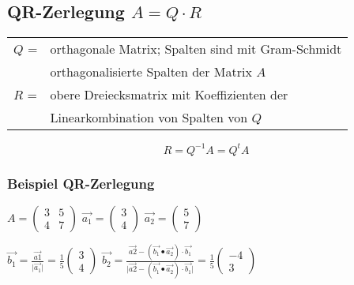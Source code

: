 				
				
				
				
		    \subsection{QR-Zerlegung $A = Q \cdot R$}
		    \begin{tabular}{ll}
		    $Q$ = & orthagonale Matrix; Spalten sind mit Gram-Schmidt\\
		          & orthagonalisierte Spalten der Matrix $A$ \\
		    $R$ = & obere Dreiecksmatrix mit Koeffizienten der  \\
		    		  & Linearkombination von Spalten von $Q$ \\   
		    \end{tabular}
		    
			$$R = Q^{-1} A = Q^t A$$    
			
			
			\subsubsection{Beispiel QR-Zerlegung}
		  	$A = \begin{pmatrix} 3 & 5 \\ 4 & 7 \end{pmatrix}$ \quad $\vec{a_1} = \begin{pmatrix}
		  	3 \\ 4 \end{pmatrix}$ \quad $\vec{a_2} = \begin{pmatrix} 5 \\ 7 \end{pmatrix}$ \\
		  	
		  	\vspace{0.2cm}
		  	
		  	
		  	$\vec{b_1} = \frac{\vec{a1}}{\vert \vec{a_1} \vert} = \frac{1}{5} \begin{pmatrix} 3 \\ 4 \end{pmatrix} $ \quad $\vec{b_2} = \frac{\vec{a2} - (\vec{b_1} \bullet \vec{a_2}) \cdot \vec{b_1}}{\vert \vec{a2} - (\vec{b_1} \bullet \vec{a_2}) \cdot \vec{b_1} \vert} = \frac{1}{5} \begin{pmatrix} -4 \\ 3 \end{pmatrix} $ \\
		  	
		  	\vspace{0.2cm}
		  	
